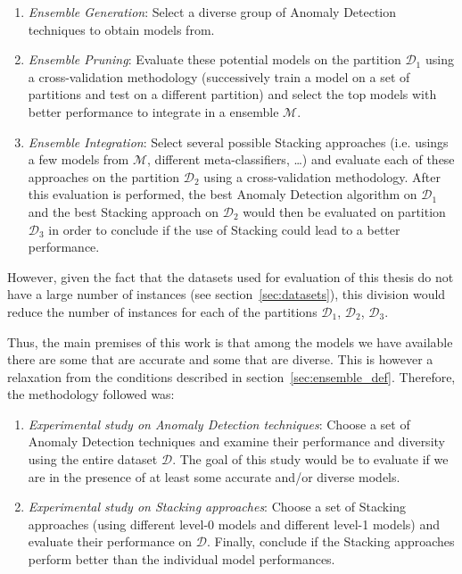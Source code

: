 \begin{enumerate}
	\item \textit{Ensemble Generation}: Select a diverse group of Anomaly Detection techniques to obtain models from.
	
	\item \textit{Ensemble Pruning}: Evaluate these potential models on the partition $\mathcal{D}_1$ using a cross-validation methodology (successively train a model on a set of partitions and test on a different partition) and select the top models with better performance to integrate in a ensemble $\mathcal{M}$.
	
	\item \textit{Ensemble Integration}: Select several possible Stacking approaches (i.e. usings a few models from $\mathcal{M}$, different meta-classifiers, \dots) and evaluate each of these approaches on the partition $\mathcal{D}_2$ using a cross-validation methodology.
	After this evaluation is performed, the best Anomaly Detection algorithm on $\mathcal{D}_1$ and the best Stacking approach on $\mathcal{D}_2$ would then be evaluated on partition $\mathcal{D}_3$ in order to conclude if the use of Stacking could lead to a better performance.
\end{enumerate}

However, given the fact that the datasets used for evaluation of this thesis do not have a large number of instances (see section~\ref{sec:datasets}), this division would reduce the number of instances for each of the partitions $\mathcal{D}_1$, $\mathcal{D}_2$, $\mathcal{D}_3$.

Thus, the main premises of this work is that among the models we have available there are some that are accurate and some that are diverse.
This is however a relaxation from the conditions described in section~\ref{sec:ensemble_def}.
Therefore, the methodology followed was:

\begin{enumerate}
	\item \textit{Experimental study on Anomaly Detection techniques}: Choose a set of Anomaly Detection techniques and examine their performance and diversity using the entire dataset $\mathcal{D}$.
	The goal of this study would be to evaluate if we are in the presence of at least some accurate and/or diverse models.
	
	\item \textit{Experimental study on Stacking approaches}: Choose a set of Stacking approaches (using different level-0 models and different level-1 models) and evaluate their performance on $\mathcal{D}$. Finally, conclude if the Stacking approaches perform better than the individual model performances.
\end{enumerate}

